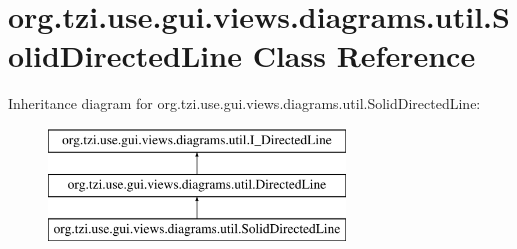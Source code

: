 \hypertarget{classorg_1_1tzi_1_1use_1_1gui_1_1views_1_1diagrams_1_1util_1_1_solid_directed_line}{\section{org.\-tzi.\-use.\-gui.\-views.\-diagrams.\-util.\-Solid\-Directed\-Line Class Reference}
\label{classorg_1_1tzi_1_1use_1_1gui_1_1views_1_1diagrams_1_1util_1_1_solid_directed_line}
}
Inheritance diagram for org.\-tzi.\-use.\-gui.\-views.\-diagrams.\-util.\-Solid\-Directed\-Line\-:\begin{figure}[H]
\begin{center}
\leavevmode
\includegraphics[height=3.000000cm]{classorg_1_1tzi_1_1use_1_1gui_1_1views_1_1diagrams_1_1util_1_1_solid_directed_line}
\end{center}
\end{figure}
